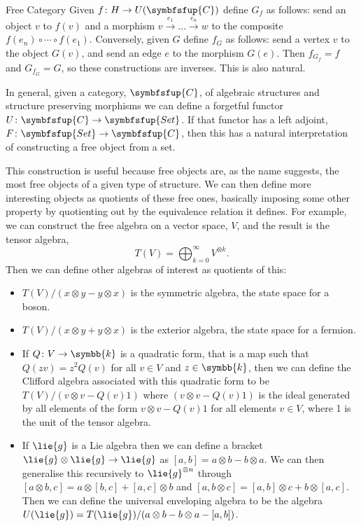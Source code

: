 \documentclass[fleqn]{NotesClass}
\makeatletter
\newcommand{\cat}[1]{\symbfsfup{#1}}
\newcommand{\c@egory}[1]{\symbfsfup{#1}}
\newcommand{\Set}{\c@egory{Set}}
\renewcommand{\field}{\symbb{k}}
\makeatother
\begin{document}
\begin{appendices}
\begin{exm}{Free Category}{}
            Given \(f \colon H \to U(\cat{C})\) define \(G_f\) as follows: send an object \(v\) to \(f(v)\) and a morphism \(v \xrightarrow{e_1} \dotso \xrightarrow{e_n} w\) to the composite \(f(e_n) \circ \dotsm \circ f(e_1)\).
            Conversely, given \(G\) define \(f_G\) as follows: send a vertex \(v\) to the object \(G(v)\), and send an edge \(e\) to the morphism \(G(e)\).
            Then \(f_{G_f} = f\) and \(G_{f_G} = G\), so these constructions are inverses.
            This is also natural.
        \end{exm}
        
        In general, given a category, \(\cat{C}\), of algebraic structures and structure preserving morphisms we can define a forgetful functor \(U \colon \cat{C} \to \Set\).
        If that functor has a left adjoint, \(F \colon \Set \to \cat{C}\), then this has a natural interpretation of constructing a free object from a set.
        
        This construction is useful because free objects are, as the name suggests, the most free objects of a given type of structure.
        We can then define more interesting objects as quotients of these free ones, basically imposing some other property by quotienting out by the equivalence relation it defines.
        For example, we can construct the free algebra on a vector space, \(V\), and the result is the tensor algebra,
        \begin{equation}
            T(V) = \bigoplus_{k=0}^{\infty} V^{\otimes k}.
        \end{equation}
        Then we can define other algebras of interest as quotients of this:
        \begin{itemize}
            \item \(T(V)/(x \otimes y - y \otimes x)\) is the symmetric algebra, the state space for a boson.
            \item \(T(V) / (x \otimes y + y \otimes x)\) is the exterior algebra, the state space for a fermion.
            \item If \(Q\colon V \to \field\) is a quadratic form, that is a map such that \(Q(zv) = z^2Q(v)\) for all \(v \in V\) and \(z \in \field\), then we can define the Clifford algebra associated with this quadratic form to be \(T(V) / (v \otimes v - Q(v)1)\) where \((v \otimes v - Q(v)1)\) is the ideal generated by all elements of the form \(v \otimes v - Q(v)1\) for all elements \(v \in V\), where 1 is the unit of the tensor algebra.
            \item If \(\lie{g}\) is a Lie algebra then we can define a bracket \(\lie{g} \otimes \lie{g} \to \lie{g}\) as \([a, b] = a \otimes b - b \otimes a\).
            We can then generalise this recursively to \(\lie{g}^{\otimes n}\) through \([a \otimes b, c] = a\otimes [b, c] + [a, c] \otimes b\) and \([a, b \otimes c] = [a, b] \otimes c + b \otimes [a, c]\).
            Then we can define the universal enveloping algebra to be the algebra \(U(\lie{g}) = T(\lie{g}) / (a \otimes b - b \otimes a - [a, b])\).
        \end{itemize}
        
    \end{appendices}
    
    \backmatter
    \printbibliography
    \printindex
\end{document}
